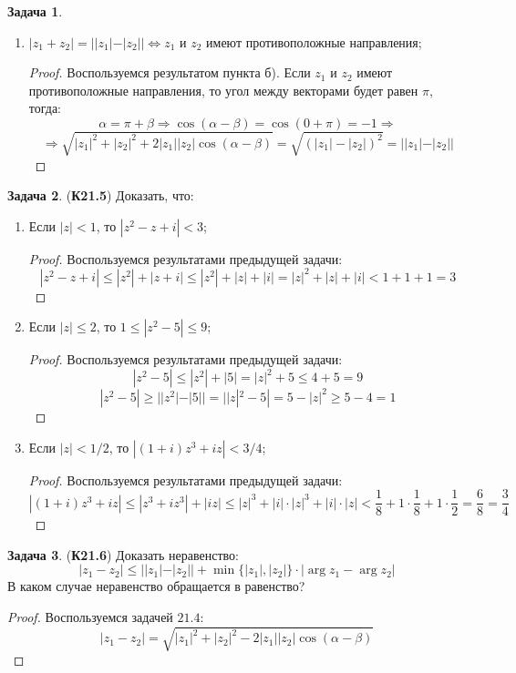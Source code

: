 \documentclass[12pt]{article}
\theoremstyle{definition}
\newtheorem{problem}{Задача}
\begin{document}
\begin{problem}
\begin{enumerate}[label=\asbuk*)]
\begin{proof}
$$			$$
		\end{proof}
		\item $|z_1 + z_2| = ||z_1| - |z_2|| \Leftrightarrow z_1$ и $z_2$ имеют противоположные направления;
		\begin{proof}
			Воспользуемся результатом пункта б). Если $z_1$ и $z_2$ имеют противоположные направления, то угол между векторами будет равен $\pi$, тогда:
			$$
				\alpha = \pi + \beta \Rightarrow \cos(\alpha - \beta) = \cos(0 + \pi) = -1 \Rightarrow 
			$$
			$$
				\Rightarrow \sqrt{|z_1|^2 + |z_2|^2 + 2|z_1||z_2|\cos(\alpha - \beta)} = \sqrt{(|z_1| - |z_2|)^2} = ||z_1| - |z_2||
			$$
		\end{proof}
	\end{enumerate}
\end{problem}

\begin{problem}(\textbf{К21.5}) Доказать, что:
	\begin{enumerate}[label=\asbuk*)]
		\item Если $|z| < 1$, то $|z^2 - z + i| < 3$;
		\begin{proof}
			Воспользуемся результатами предыдущей задачи:
			$$
				|z^2 - z + i| \leq |z^2| + |z + i| \leq |z^2|+ |z| + |i| = |z|^2 + |z| + |i| < 1 + 1 + 1 = 3
			$$
		\end{proof}
		\item Если $|z| \leq 2$, то $1 \leq |z^2 - 5| \leq 9$;
		\begin{proof}
			Воспользуемся результатами предыдущей задачи:
			$$
				|z^2-5| \leq |z^2| + |5| = |z|^2 + 5 \leq 4 + 5 = 9
			$$
			$$
				|z^2 - 5| \geq ||z^2| - |5|| = ||z|^2 - 5| = 5 - |z|^2 \geq 5 - 4 = 1
			$$
		\end{proof}
		\item Если $|z| < 1/2$, то $|(1 + i)z^3 + iz| < 3/4$;
		\begin{proof}
			Воспользуемся результатами предыдущей задачи:
			$$
				|(1 + i)z^3 + iz| \leq |z^3 + iz^3| + |iz| \leq |z|^3 + |i|{\cdot}|z|^3 + |i|{\cdot}|z| < \dfrac{1}{8} + 1{\cdot}\dfrac{1}{8} + 1{\cdot}\dfrac{1}{2} = \dfrac{6}{8} = \dfrac{3}{4} 
			$$
		\end{proof}
	\end{enumerate}
\end{problem}

\begin{problem}(\textbf{К21.6}) Доказать неравенство:
	$$
		|z_1 - z_2| \leq ||z_1| - |z_2|| + \min\{|z_1|,|z_2|\}{\cdot}|\arg z_1 -\arg z_2|
	$$
	В каком случае неравенство обращается в равенство?
\end{problem}
\begin{proof}
	Воспользуемся задачей $21.4$:
	$$
		|z_1 - z_2| = \sqrt{|z_1|^2 + |z_2|^2 - 2|z_1||z_2|\cos(\alpha - \beta)}
	$$
\end{proof}
\end{document}
